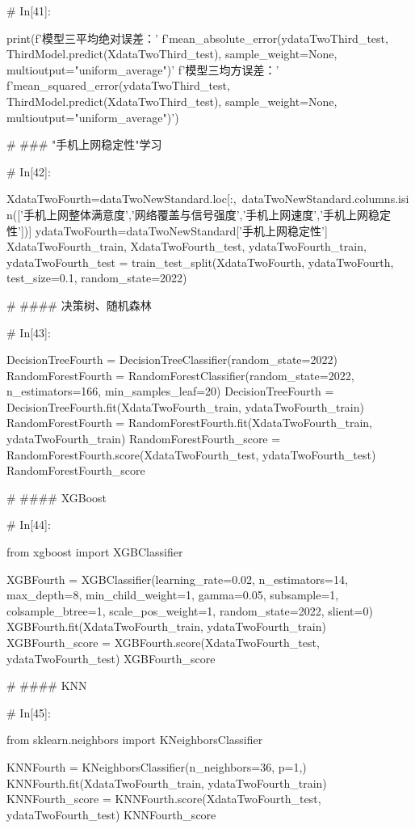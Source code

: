 \documentclass{MathorCupmodeling}
\begin{document}
\begin{python}
# In[41]:


print(f'模型三平均绝对误差：'
      f'{mean_absolute_error(ydataTwoThird_test, ThirdModel.predict(XdataTwoThird_test), sample_weight=None, multioutput="uniform_average")}\n'
      f'模型三均方误差：'
      f'{mean_squared_error(ydataTwoThird_test, ThirdModel.predict(XdataTwoThird_test), sample_weight=None, multioutput="uniform_average")}')


# ### "手机上网稳定性"学习

# In[42]:


XdataTwoFourth=dataTwoNewStandard.loc[:,~dataTwoNewStandard.columns.isin(['手机上网整体满意度','网络覆盖与信号强度','手机上网速度','手机上网稳定性'])]
ydataTwoFourth=dataTwoNewStandard['手机上网稳定性']
XdataTwoFourth_train, XdataTwoFourth_test, ydataTwoFourth_train, ydataTwoFourth_test = train_test_split(XdataTwoFourth, ydataTwoFourth, test_size=0.1, random_state=2022)


# #### 决策树、随机森林

# In[43]:


DecisionTreeFourth = DecisionTreeClassifier(random_state=2022)
RandomForestFourth = RandomForestClassifier(random_state=2022, n_estimators=166, min_samples_leaf=20)
DecisionTreeFourth = DecisionTreeFourth.fit(XdataTwoFourth_train, ydataTwoFourth_train)
RandomForestFourth = RandomForestFourth.fit(XdataTwoFourth_train, ydataTwoFourth_train)
RandomForestFourth_score = RandomForestFourth.score(XdataTwoFourth_test, ydataTwoFourth_test)
RandomForestFourth_score


# #### XGBoost

# In[44]:


from xgboost import XGBClassifier

XGBFourth = XGBClassifier(learning_rate=0.02,
                          n_estimators=14,
                          max_depth=8,
                          min_child_weight=1,
                          gamma=0.05,
                          subsample=1,
                          colsample_btree=1,
                          scale_pos_weight=1,
                          random_state=2022,
                          slient=0)
XGBFourth.fit(XdataTwoFourth_train, ydataTwoFourth_train)
XGBFourth_score = XGBFourth.score(XdataTwoFourth_test, ydataTwoFourth_test)
XGBFourth_score


# #### KNN

# In[45]:


from sklearn.neighbors import KNeighborsClassifier

KNNFourth = KNeighborsClassifier(n_neighbors=36, p=1,)
KNNFourth.fit(XdataTwoFourth_train, ydataTwoFourth_train)
KNNFourth_score = KNNFourth.score(XdataTwoFourth_test, ydataTwoFourth_test)
KNNFourth_score



\end{python}
\end{document}
